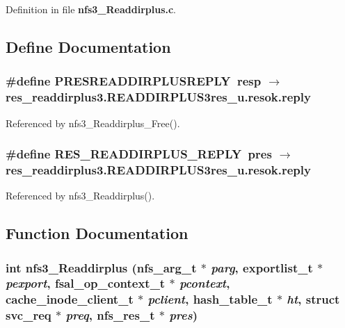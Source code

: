 Definition in file {\bf nfs3\_\-Readdirplus.c}.

\subsection{Define Documentation}
\subsubsection{\setlength{\rightskip}{0pt plus 5cm}\#define PRESREADDIRPLUSREPLY\ resp $\rightarrow$ res\_\-readdirplus3.READDIRPLUS3res\_\-u.resok.reply}\label{nfs3__Readdirplus_8c_a1}




Referenced by nfs3\_\-Readdirplus\_\-Free().
\subsubsection{\setlength{\rightskip}{0pt plus 5cm}\#define RES\_\-READDIRPLUS\_\-REPLY\ pres $\rightarrow$ res\_\-readdirplus3.READDIRPLUS3res\_\-u.resok.reply}\label{nfs3__Readdirplus_8c_a0}




Referenced by nfs3\_\-Readdirplus().

\subsection{Function Documentation}
\subsubsection{\setlength{\rightskip}{0pt plus 5cm}int nfs3\_\-Readdirplus (nfs\_\-arg\_\-t $\ast$ {\em parg}, exportlist\_\-t $\ast$ {\em pexport}, fsal\_\-op\_\-context\_\-t $\ast$ {\em pcontext}, cache\_\-inode\_\-client\_\-t $\ast$ {\em pclient}, hash\_\-table\_\-t $\ast$ {\em ht}, struct svc\_\-req $\ast$ {\em preq}, nfs\_\-res\_\-t $\ast$ {\em pres})}\label{nfs3__Readdirplus_8c_a2}


